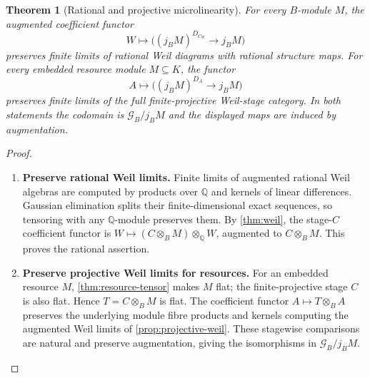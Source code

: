 \documentclass[11pt,a4paper]{article}
\numberwithin{algorithm}{section}
\numberwithin{equation}{section}
\newtheorem{theorem}{Theorem}[section]
\theoremstyle{definition}
\theoremstyle{remark}
\theoremstyle{plain}
\newcommand{\QQ}{\mathbb Q}
\newcommand{\Geo}{\mathcal G_B}
\theoremstyle{definition}
\theoremstyle{plain}
\begin{document}
\begin{theorem}[Rational and projective microlinearity]
\label{thm:microlinearity}
For every $B$-module $M$, the augmented coefficient functor
\[
 W\longmapsto\bigl((j_BM)^{D_{C_W}}\to j_BM\bigr)
\]
preserves finite limits of rational Weil diagrams with rational
structure maps.  For every embedded resource module $M\subseteq K$,
the functor
\[
 A\longmapsto\bigl((j_BM)^{D_A}\to j_BM\bigr)
\]
preserves finite limits of the full finite-projective Weil-stage
category.  In both statements the codomain is $\Geo/j_BM$ and
the displayed maps are induced by augmentation.
\end{theorem}
\begin{proof}\leavevmode
\begin{enumerate}[leftmargin=*,align=left]
\item \textbf{Preserve rational Weil limits.}
Finite limits of augmented rational Weil algebras are computed
by products over $\QQ$ and kernels of linear differences.
Gaussian elimination splits their finite-dimensional exact
sequences, so tensoring with any $\QQ$-module preserves them.
By \cref{thm:weil}, the stage-$C$ coefficient functor is
$W\mapsto(C\otimes_BM)\otimes_\QQ W$, augmented to
$C\otimes_BM$. This proves the rational assertion.

\item \textbf{Preserve projective Weil limits for resources.}
For an embedded resource $M$, \cref{thm:resource-tensor} makes
$M$ flat; the finite-projective stage $C$ is also flat.
Hence $T=C\otimes_BM$ is flat. The coefficient functor
$A\mapsto T\otimes_BA$ preserves the underlying module
fibre products and kernels computing the augmented Weil limits
of \cref{prop:projective-weil}. These stagewise comparisons
are natural and preserve augmentation, giving the isomorphisms
in $\Geo/j_BM$.
\end{enumerate}
\end{proof}
\end{document}
